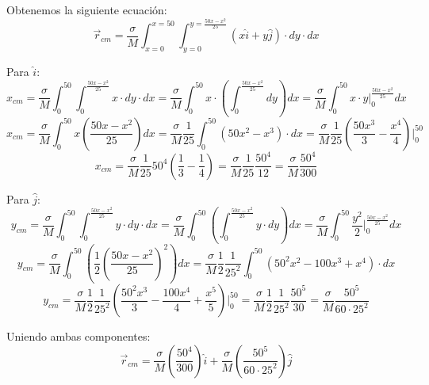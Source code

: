 \documentclass[letter,11pt]{article}
\begin{document}
Obtenemos la siguiente ecuación:
\begin{equation*}
    \vec{r}_{cm} = \frac{\sigma}{M} \int_{x = 0}^{x = 50} \int_{y = 0}^{y = \frac{50x - x^2}{25}} (x \hat{i} + y \hat{j}) \cdot dy \cdot dx
\end{equation*}

Para $\hat{i}$:
\begin{equation*}
    x_{cm} = \frac{\sigma}{M} \int_{0}^{50} \int_{0}^{\frac{50x - x^2}{25}} x \cdot dy \cdot dx = \frac{\sigma}{M} \int_{0}^{50} x \cdot \left(\int_{0}^{\frac{50x - x^2}{25}} dy \right) dx = \frac{\sigma}{M} \int_{0}^{50} x \cdot y\Biggr|_{0}^{\frac{50x - x^2}{25}} dx
\end{equation*}
\begin{equation*}
    x_{cm} = \frac{\sigma}{M} \int_{0}^{50} x \left(\frac{50x - x^2}{25} \right) dx = \frac{\sigma}{M} \frac{1}{25} \int_{0}^{50} (50x^2 - x^3) \cdot dx = \frac{\sigma}{M} \frac{1}{25} \left(\frac{50x^3}{3} - \frac{x^4}{4}\right)\Biggr|_{0}^{50}
\end{equation*}
\begin{equation*}
    x_{cm} = \frac{\sigma}{M} \frac{1}{25} 50^4 \left(\frac{1}{3} - \frac{1}{4}\right) = \frac{\sigma}{M}\frac{1}{25}\frac{50^4}{12} = \frac{\sigma}{M} \frac{50^4}{300}
\end{equation*}

Para $\hat{j}$:
\begin{equation*}
    y_{cm} = \frac{\sigma}{M} \int_{0}^{50} \int_{0}^{\frac{50x - x^2}{25}} y \cdot dy \cdot dx = \frac{\sigma}{M} \int_{0}^{50} \left(\int_{0}^{\frac{50x - x^2}{25}} y \cdot dy \right) dx = \frac{\sigma}{M} \int_{0}^{50} \frac{y^2}{2}\Biggr|_{0}^{\frac{50x - x^2}{25}} dx
\end{equation*}
\begin{equation*}
    y_{cm} = \frac{\sigma}{M} \int_{0}^{50} \left(\frac{1}{2} \left(\frac{50x - x^2}{25}\right)^2 \right) dx = \frac{\sigma}{M} \frac{1}{2} \frac{1}{25^2} \int_{0}^{50} (50^2 x^2 - 100 x^3 + x^4) \cdot dx
\end{equation*}
\begin{equation*}
    y_{cm} = \frac{\sigma}{M} \frac{1}{2} \frac{1}{25^2} \left(\frac{50^2 x^3}{3} - \frac{100 x^4}{4} + \frac{x^5}{5}\right)\Biggr|_{0}^{50} = \frac{\sigma}{M} \frac{1}{2} \frac{1}{25^2} \frac{50^5}{30} = \frac{\sigma}{M} \frac{50^5}{60 \cdot 25^2}
\end{equation*}

\vspace{0.5cm}
Uniendo ambas componentes:
\begin{equation}
    \vec{r}_{cm} = \frac{\sigma}{M} \left( \frac{50^4}{300} \right) \hat{i} + \frac{\sigma}{M} \left( \frac{50^5}{60 \cdot 25^2} \right) \hat{j}
\label{vector1}
\end{equation}
\end{document}
